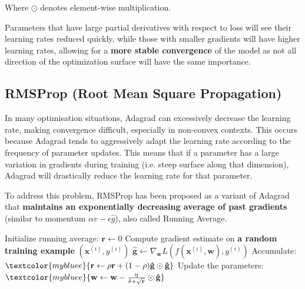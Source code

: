 Where $\odot$ denotes element-wise multiplication.

Parameters that have large partial derivatives with respect to loss will see their learning rates reduced quickly, while those with smaller gradients will have higher learning rates, allowing for a \textbf{more stable convergence} of the model as not all direction of the optimization surface will have the same importance. 

\subsection{RMSProp (Root Mean Square Propagation)}

In many optimisation situations, Adagrad can excessively decrease the learning rate, making convergence difficult, especially in non-convex contexts. This occurs because Adagrad tends to aggressively adapt the learning rate according to the frequency of parameter updates. This means that if a parameter has a large variation in gradients during training (i.e. steep surface along that dimension), Adagrad will drastically reduce the learning rate for that parameter.

To address this problem, RMSProp has been proposed as a variant of Adagrad that \textbf{maintains an exponentially decreasing average of past gradients} (similar to momentum $\alpha v -\epsilon\hat{g}$), also called Running Average.

\begin{algorithm}
\renewcommand\thealgorithm{}
\caption{\textbf{\textcolor{mygreen}{RMSProp}}}
\begin{algorithmic}[1]
\STATE Initialize running average: $\mathbf{r} \leftarrow 0$
\STATE Compute gradient estimate on \textbf{\textcolor{myred}{a random training example}} $(\mathbf{x}^{(i)}, y^{(i)})$
\STATE $\mathbf{\hat{g}} \leftarrow \nabla_{\mathbf{w}} L(f(\mathbf{x}^{(i)},\mathbf{w}), y^{(i)})$
\STATE Accumulate:
$\textcolor{mybluee}{\mathbf{r} \leftarrow \rho \mathbf{r} + (1 - \rho) \mathbf{\hat{g}} \odot \mathbf{\hat{g}}}$
\STATE Update the parameters:
$\textcolor{mybluee}{\mathbf{w} \leftarrow \mathbf{w} - \frac{\eta}{\delta + \sqrt{\mathbf{r}}} \odot \mathbf{\hat{g}}}$
\ENDWHILE
\end{algorithmic}
\end{algorithm}

